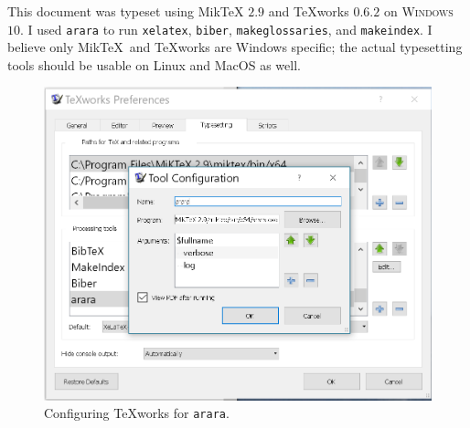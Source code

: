 
This document was typeset using Mik\TeX{} $2.9$ \cite{Miktex2017} 
and {\TeX}works $0.6.2$ \cite{Texworks2017} 
on \textsc{Windows} $10$. 
I used \texttt{arara} \cite{arara2017} 
to run \texttt{xelatex}, \texttt{biber}, \texttt{makeglossaries},  and
\texttt{makeindex}.
I believe only Mik\TeX\  and {\TeX}works are Windows specific; 
the actual typesetting tools should be usable on Linux and MacOS as well.

\begin{figure}[htbp]
\centering
\includegraphics[scale=0.5]{../figs/arara.png}
\caption{Configuring {\TeX}works for \texttt{arara}.}
\label{fig:arara}
\end{figure}
